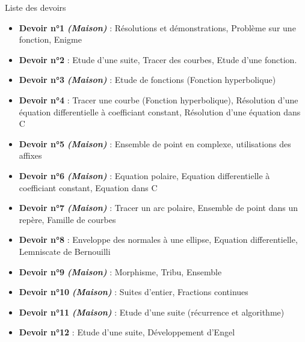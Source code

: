 \documentclass[a4paper,12pt,oneside]{report}
\begin{document}
\begin{center}
\begin{LARGE}Liste des devoirs\end{LARGE}
\end{center}\begin{itemize}
 \item \textbf{Devoir n°1} \textit{\textbf{(Maison)}} : Résolutions et démonstrations, Problème sur une fonction, Enigme \\
 \item \textbf{Devoir n°2} : Etude d'une suite, Tracer des courbes, Etude d'une fonction.\\
 \item \textbf{Devoir n°3} \textit{\textbf{(Maison)}} : Etude de fonctions (Fonction hyperbolique)\\
 \item \textbf{Devoir n°4} : Tracer une courbe (Fonction hyperbolique), Résolution d'une équation differentielle à coefficiant constant, Résolution d'une équation dans C  \\
 \item \textbf{Devoir n°5} \textit{\textbf{(Maison)}} : Ensemble de point en complexe, utilisations des affixes \\
 \item \textbf{Devoir n°6} \textit{\textbf{(Maison)}} : Equation polaire, Equation differentielle à coefficiant constant, Equation dans C \\
 \item \textbf{Devoir n°7} \textit{\textbf{(Maison)}} : Tracer un arc polaire, Ensemble de point dans un repère, Famille de courbes \\
 \item \textbf{Devoir n°8} : Enveloppe des normales à une ellipse, Equation differentielle, Lemniscate de Bernouilli \\
 \item \textbf{Devoir n°9} \textit{\textbf{(Maison)}} : Morphisme, Tribu, Ensemble \\
 \item \textbf{Devoir n°10} \textit{\textbf{(Maison)}} : Suites d'entier, Fractions continues \\
 \item \textbf{Devoir n°11} \textit{\textbf{(Maison)}} : Etude d'une suite (récurrence et algorithme) \\
 \item \textbf{Devoir n°12} : Etude d'une suite, Développement d'Engel \\

\end{itemize}
\end{document}
